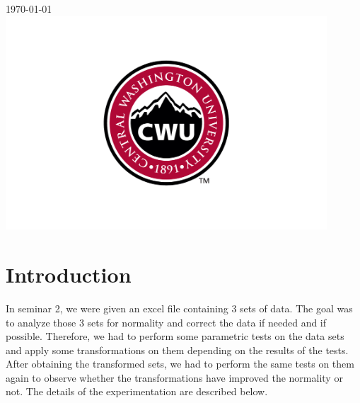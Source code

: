 \documentclass[12pt]{article}
\begin{document}
\begin{titlepage}
		
		
		{\large \today}\\ %
		
		
		\includegraphics[width=12cm]{CWU-Logo.png}\\[.5cm] %
		
		
		\vfill %
		
	\end{titlepage}
	\newpage
	\tableofcontents
	\newpage
	
	
	
	\section{Introduction}
	
		In seminar 2, we were given an excel file containing 3 sets of data. The goal was to analyze those 3 sets for normality and correct the data if needed and if possible. Therefore, we had to perform some parametric tests on the data sets and apply some transformations on them depending on the results of the tests. After obtaining the transformed sets, we had to perform the same tests on them again to observe whether the transformations have improved the normality or not. The details of the experimentation are described below.
\end{document}
